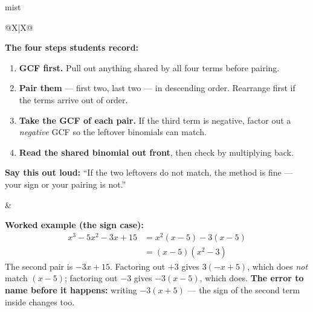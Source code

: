 \documentclass[10pt]{article}
\begin{document}
\boxguard
\begin{skillbox}{mist}
\begin{tabularx}{\linewidth}{@{}X|X@{}}
\begin{minipage}[t]{\linewidth}\vspace{0pt}
\textbf{The four steps students record:}
\begin{enumerate}[leftmargin=1.4em, itemsep=2pt, topsep=2pt]
  \item \textbf{GCF first.} Pull out anything shared by all four terms before pairing.
  \item \textbf{Pair them} --- first two, last two --- in descending order. Rearrange first if the
        terms arrive out of order.
  \item \textbf{Take the GCF of each pair.} If the third term is negative, factor out a
        \emph{negative} GCF so the leftover binomials can match.
  \item \textbf{Read the shared binomial out front}, then check by multiplying back.
\end{enumerate}
\textbf{Say this out loud:} ``If the two leftovers do not match, the method is fine --- your sign or
your pairing is not.''
\end{minipage}
&
\begin{minipage}[t]{\linewidth}\vspace{0pt}
\textbf{Worked example (the sign case):}
\[
\begin{aligned}
x^3-5x^2-3x+15 &= x^2(x-5) - 3(x-5) \\
               &= (x-5)\left(x^2-3\right)
\end{aligned}
\]
The second pair is $-3x+15$. Factoring out $+3$ gives $3(-x+5)$, which does \emph{not} match
$(x-5)$; factoring out $-3$ gives $-3(x-5)$, which does. \textbf{The error to name before it
happens:} writing $-3(x+5)$ --- the sign of the second term inside changes too.
\end{minipage}
\end{tabularx}
\end{skillbox}
\end{document}
